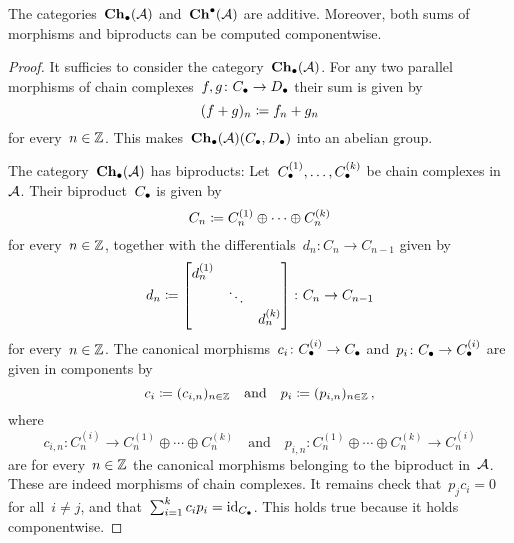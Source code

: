 \begin{lemma}
  \label{chain complexes are additive}
  The categories~$\mathbf{Ch}_\bullet(\mathcal{A})$ and~$\mathbf{Ch}^\bullet(\mathcal{A})$ are additive.
  Moreover, both sums of morphisms and biproducts can be computed componentwise.
\end{lemma}


\begin{proof}
  It sufficies to consider the category~$\mathbf{Ch}_\bullet(\mathcal{A})$.
  For any two parallel morphisms of chain complexes~$f, g \colon C_\bullet \to D_\bullet$ their sum is given by
  \[
              (f + g)_n
    \coloneqq  f_n + g_n
  \]
  for every~$n \in \mathbb{Z}$.
  This makes~$\mathbf{Ch}_\bullet(\mathcal{A})(C_\bullet, D_\bullet)$ into an abelian group.
  
  The category~$\mathbf{Ch}_\bullet(\mathcal{A})$ has biproducts:
  Let~$C_\bullet^{(1)}, \dotsc, C_\bullet^{(k)}$ be chain complexes in~$\mathcal{A}$.
  Their biproduct~$C_\bullet$ is given by
  \[
              C_n
    \coloneqq  C^{(1)}_n \oplus \dotsb \oplus C^{(k)}_n
  \]
  for every~$n \in \mathbb{Z}$, together with the differentials~$d_n \colon C_n \to C_{n-1}$ given by
  \[
              d_n
    \coloneqq  \begin{bmatrix}
                d^{(1)}_n &         &           \\
                          & \ddots  &           \\
                          &         & d^{(k)}_n
              \end{bmatrix}
    \colon    C_n
    \to       C_{n-1}
  \]
  for every~$n \in \mathbb{Z}$.
  The canonical morphisms~$c_i \colon C_\bullet^{(i)} \to C_\bullet$ and~$p_i \colon C_\bullet \to C_\bullet^{(i)}$ are given in components by
  \[
              c_i
    \coloneqq  (c_{i,n})_{n \in \mathbb{Z}}
    \quad\text{and}\quad
              p_i
    \coloneqq  (p_{i,n})_{n \in \mathbb{Z}} \,,
  \]
  where
  \[
            c_{i,n}
    \colon  C^{(i)}_n
    \to     C^{(1)}_n \oplus \dotsb \oplus C^{(k)}_n
    \quad\text{and}\quad
            p_{i,n}
    \colon  C^{(1)}_n \oplus \dotsb \oplus C^{(k)}_n
    \to     C^{(i)}_n
  \]
  are for every~$n \in \mathbb{Z}$ the canonical morphisms belonging to the biproduct in~$\mathcal{A}$.
  These are indeed morphisms of chain complexes.
  It remains check that~$p_j c_i = 0$ for all~$i \neq j$, and that~$\sum_{i=1}^k c_i p_i = \operatorname{id}_{C_\bullet}$.
  This holds true because it holds componentwise.
\end{proof}


